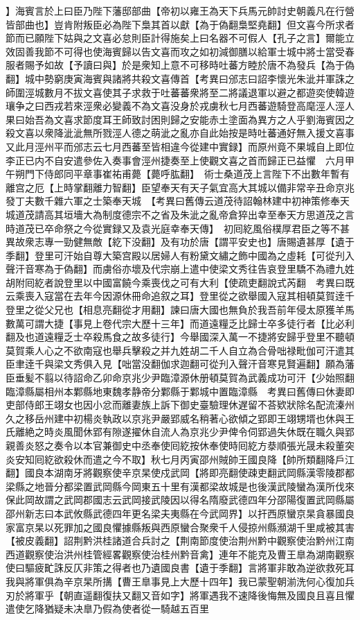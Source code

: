 】海賓言於上曰臣乃陛下藩邸部曲【帝初以雍王為天下兵馬元帥討史朝義凡在行營皆部曲也】豈肯附叛臣必為陛下梟其首以獻【為于偽翻梟堅堯翻】但文喜今所求者節而已願陛下姑與之文喜必怠則臣計得施矣上曰名器不可假人【孔子之言】爾能立效固善我節不可得也使海賓歸以告文喜而攻之如初減御膳以給軍士城中將士當受春服者賜予如故【予讀曰與】於是衆知上意不可移時吐蕃方睦於唐不為發兵【為于偽翻】城中勢窮庚寅海賓與諸將共殺文喜傳首【考異曰邠志曰詔李懷光朱泚并軍誅之師圍涇城數月不拔文喜使其子求救于吐蕃蕃衆將至二將議退軍以避之都遊奕使韓遊瓖争之曰西戎若來涇衆必變義不為文喜没身於戎虜秋七月西蕃遊騎登高麾涇人涇人果曰始吾為文喜求節度耳王師致討困則歸之安能赤土塗面為異方之人乎劉海賓因之殺文喜以衆降泚泚無所戮涇人德之萌泚之亂亦自此始按是時吐蕃通好無入援文喜事又此月涇州平而邠志云七月西蕃至皆相違今從建中實録】而原州竟不果城自上即位李正已内不自安遣參佐入奏事會涇州捷奏至上使觀文喜之首而歸正已益懼　六月甲午朔門下侍郎同平章事崔祐甫薨【薨呼肱翻】　術士桑道茂上言陛下不出數年暫有離宫之厄【上時掌翻離力智翻】臣望奉天有天子氣宜高大其城以備非常辛丑命京兆發丁夫數千雜六軍之士築奉天城　【考異曰舊傳云道茂待詔翰林建中初神策修奉天城道茂請高其垣墻大為制度德宗不之省及朱泚之亂帝倉猝出幸至奉天方思道茂之言時道茂已卒命祭之今從實録又及袁光庭幸奉天傳】　初囘紇風俗樸厚君臣之等不甚異故衆志專一勁健無敵【紇下没翻】及有功於唐【謂平安史也】唐賜遺甚厚【遺于季翻】登里可汗始自尊大築宫殿以居婦人有粉黛文繡之飾中國為之虛耗【可從刋入聲汗音寒為于偽翻】而虜俗亦壞及代宗崩上遣中使梁文秀往告哀登里驕不為禮九姓胡附囘紇者說登里以中國富饒今乘喪伐之可有大利【使疏吏翻說式芮翻　考異曰既云乘喪入寇當在去年今因源休冊命追叙之耳】登里從之欲舉國入寇其相頓莫賀逹千登里之從父兄也【相息亮翻從才用翻】諫曰唐大國也無負於我吾前年侵太原獲羊馬數萬可謂大捷【事見上卷代宗大歷十三年】而道遠糧乏比歸士卒多徒行者【比必利翻及也道遠糧乏士卒殺馬食之故多徒行】今舉國深入萬一不捷將安歸乎登里不聽頓莫賀乘人心之不欲南寇也舉兵擊殺之并九姓胡二千人自立為合骨咄禄毗伽可汗遣其臣聿逹千與梁文秀俱入見【咄當没翻伽求迦翻可從刋入聲汗音寒見賢遍翻】願為藩臣垂髪不翦以待詔命乙卯命京兆少尹臨漳源休册頓莫賀為武義成功可汗【少始照翻臨漳縣屬相州本鄴縣地東魏孝静帝分鄴縣于鄴城中置臨漳縣　考異曰舊傳曰休妻即吏部侍郎王翊女也因小忿而離妻族上訴下御史臺驗理休遅留不荅欵狀除名配流溱州久之移岳州建中初楊炎執政以京兆尹嚴郢威名稍著心欲傾之郢即王翊甥壻也休與王氏離絶之時炎風聞休郢有隙遂擢休自流人為京兆少尹俾令伺郢過失休既在職久與郢親善炎怒之奏令以本官兼御史中丞奉使囘紇按休奉使時囘紇方㳟順張光晟未殺董突炎安知囘紇欲殺休而遣之今不取】秋七月丙寅邵州賊帥王國良降【帥所類翻降戶江翻】國良本湖南牙將觀察使辛京杲使戍武岡【將即亮翻使疎吏翻武岡縣漢零陵郡都梁縣之地晉分都梁置武岡縣今岡東五十里有漢都梁故城是也後漢武陵蠻為漢所伐來保此岡故謂之武岡郡國志云武岡接武陵因以得名隋廢武德四年分邵陽復置武岡縣屬邵州新志曰本武攸縣武德四年更名梁夫夷縣在今武岡界】以扞西原蠻京杲貪暴國良家富京杲以死罪加之國良懼據縣叛與西原蠻合聚衆千人侵掠州縣瀕湖千里咸被其害【被皮義翻】詔荆黔洪桂諸道合兵討之【荆南節度使治荆州黔中觀察使治黔州江南西道觀察使治洪州桂管經畧觀察使治桂州黔音禽】連年不能克及曹王臯為湖南觀察使曰驅疲甿誅反仄非策之得者也乃遺國良書【遺于季翻】言將軍非敢為逆欲救死耳我與將軍俱為辛京杲所搆【曹王臯事見上大歷十四年】我已蒙聖朝湔洗何心復加兵刃於將軍乎【朝直遥翻復扶又翻又音如字】將軍遇我不速降後悔無及國良且喜且懼遣使乞降猶疑未决臯乃假為使者從一騎越五百里